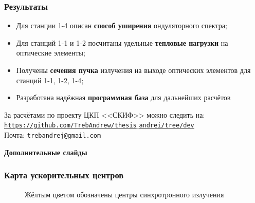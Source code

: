 \documentclass[14pt, hyperref = {colorlinks},xcolor=table ]{beamer}
\begin{document}
\small
\begin{frame}
\frametitle{Результаты}\label{t1}
\begin{center}
	\begin{itemize}
		\item Для станции 1-4 описан \textbf{способ уширения} ондуляторного спектра;
		\item Для станций 1-1 и 1-2 посчитаны удельные \textbf{тепловые нагрузки} на оптические элементы;
		\item Получены \textbf{сечения пучка} излучения на выходе оптических элементов для станций 1-1, 1-2, 1-4;
		\item Разработана надёжная \textbf{программная база} для дальнейших расчётов
		
	\end{itemize}
\end{center}
За расчётами по проекту ЦКП <<СКИФ>> можно следить на:\\
\href{https://github.com/TrebAndrew/thesis_andrei/tree/dev}{\texttt{https://github.com/TrebAndrew/thesis$\_$andrei/tree/dev}}\\
\vspace{5pt}
Почта: \texttt{trebandrej@gmail.com}\\
\end{frame}

\maketitle


\begin{frame}
\begin{center}
	\textbf{Дополнительные слайды}
\end{center}
\end{frame}

\small
\begin{frame}\label{r3}
\frametitle{Карта ускорительных центров}
\vspace{-20pt}
\begin{figure}[h]
	\raggedright\tiny{Жёлтым цветом обозначены центры синхротронного излучения}
\end{figure}
\end{frame}
\end{document}
